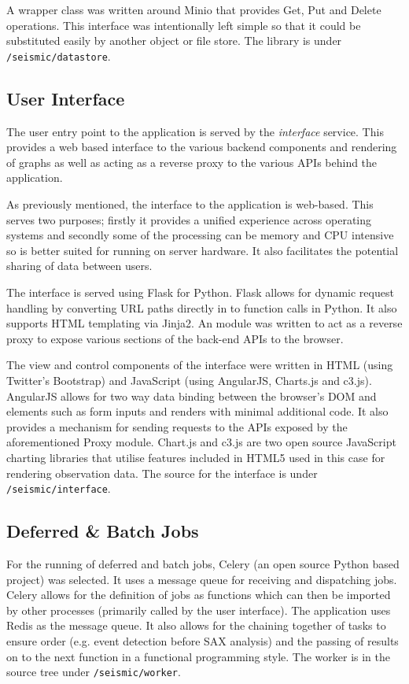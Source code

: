 \documentclass[../report.tex]{subfiles}
\begin{document}
	A wrapper class was written around Minio that provides Get, Put and Delete operations.  This interface was intentionally left simple so that it could be substituted easily by another object or file store.  The library is under \texttt{/seismic/datastore}.
	
\subsection{User Interface}
	
	The user entry point to the application is served by the \textit{interface} service.  This provides a web based interface to the various backend components and rendering of graphs as well as acting as a reverse proxy to the various APIs behind the application.
	
	As previously mentioned, the interface to the application is web-based.  This serves two purposes; firstly it provides a unified experience across operating systems and secondly some of the processing can be memory and CPU intensive so is better suited for running on server hardware.  It also facilitates the potential sharing of data between users.
	
	The interface is served using Flask for Python.  Flask allows for dynamic request handling by converting URL paths directly in to function calls in Python.  It also supports HTML templating via Jinja2.  An module was written to act as a reverse proxy to expose various sections of the back-end APIs to the browser.
	
	The view and control components of the interface were written in HTML (using Twitter's Bootstrap) and JavaScript (using AngularJS, Charts.js and c3.js).  AngularJS allows for two way data binding between the browser's DOM and elements such as form inputs and renders with minimal additional code.  It also provides a mechanism for sending requests to the APIs exposed by the aforementioned Proxy module.  Chart.js and c3.js are two open source JavaScript charting libraries that utilise features included in HTML5 used in this case for rendering observation data.  The source for the interface is under \texttt{/seismic/interface}.

\subsection{Deferred \& Batch Jobs} \label{sec:worker}
	
	For the running of deferred and batch jobs, Celery (an open source Python based project) was selected.  It uses a message queue for receiving and dispatching jobs.  Celery allows for the definition of jobs as functions which can then be imported by other processes (primarily called by the user interface).  The application uses Redis as the message queue. It also allows for the chaining together of tasks to ensure order (e.g. event detection before SAX analysis) and the passing of results on to the next function in a functional programming style.  The worker is in the source tree under \texttt{/seismic/worker}.
	
\end{document}
